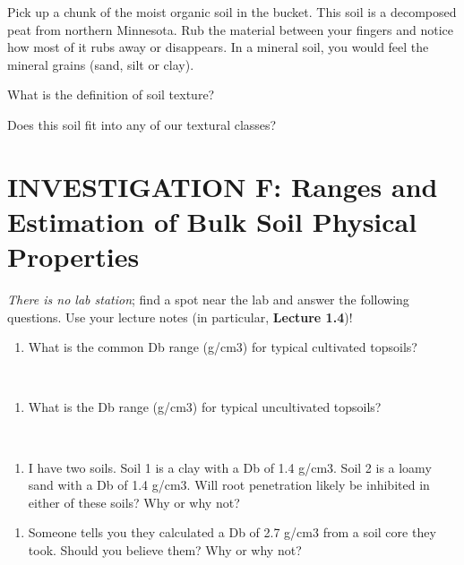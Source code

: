\documentclass[
  letterpaper,
  twocolumn,
  portrait]{scrbook}
\providecommand{\tightlist}{%
  \setlength{\itemsep}{0pt}\setlength{\parskip}{0pt}}\usepackage{longtable,booktabs,array}
\begin{document}
Pick up a chunk of the moist organic soil in the bucket. This soil is a
decomposed peat from northern Minnesota. Rub the material between your
fingers and notice how most of it rubs away or disappears. In a mineral
soil, you would feel the mineral grains (sand, silt or clay).

What is the definition of soil texture?

Does this soil fit into any of our textural classes?

\hypertarget{investigation-f-ranges-and-estimation-of-bulk-soil-physical-properties}{%
\section{INVESTIGATION F: Ranges and Estimation of Bulk Soil Physical
Properties}\label{investigation-f-ranges-and-estimation-of-bulk-soil-physical-properties}}

\emph{There is no lab station}; find a spot near the lab and answer the
following questions. Use your lecture notes (in particular,
\textbf{Lecture 1.4})!

\begin{enumerate}
\def\labelenumi{\arabic{enumi}.}
\tightlist
\item
  What is the common Db range (g/cm3) for typical cultivated topsoils?
\end{enumerate}

~ ~

\begin{enumerate}
\def\labelenumi{\arabic{enumi}.}
\setcounter{enumi}{1}
\tightlist
\item
  What is the Db range (g/cm3) for typical uncultivated topsoils?
\end{enumerate}

~ ~

\begin{enumerate}
\def\labelenumi{\arabic{enumi}.}
\setcounter{enumi}{2}
\tightlist
\item
  I have two soils. Soil 1 is a clay with a Db of 1.4 g/cm3. Soil 2 is a
  loamy sand with a Db of 1.4 g/cm3. Will root penetration likely be
  inhibited in either of these soils? Why or why not?
\end{enumerate}

\begin{enumerate}
\def\labelenumi{\arabic{enumi}.}
\setcounter{enumi}{3}
\tightlist
\item
  Someone tells you they calculated a Db of 2.7 g/cm3 from a soil core
  they took. Should you believe them? Why or why not?
\end{enumerate}
\end{document}
